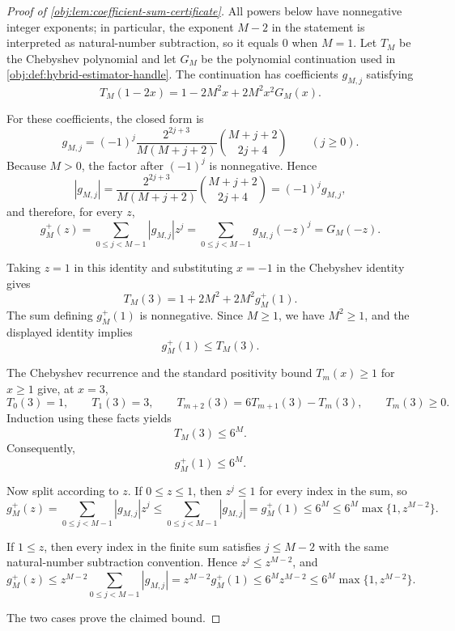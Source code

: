 \begin{proof}[Proof of \cref{obj:lem:coefficient-sum-certificate}]
All powers below have nonnegative integer exponents; in particular, the exponent \(M-2\) in the statement is interpreted as natural-number subtraction, so it equals \(0\) when \(M=1\).  Let \(T_M\) be the Chebyshev polynomial and let \(G_M\) be the polynomial continuation used in \cref{obj:def:hybrid-estimator-handle}.  The continuation has coefficients \(g_{M,j}\) satisfying
\[
T_M(1-2x)
=
1-2M^2x+2M^2x^2G_M(x).
\]

For these coefficients, the closed form is
\[
g_{M,j}
=
(-1)^j
\frac{2^{2j+3}}{M(M+j+2)}
{M+j+2\choose 2j+4}
\qquad (j\ge0).
\]
Because \(M>0\), the factor after \((-1)^j\) is nonnegative.  Hence
\[
|g_{M,j}|
=
\frac{2^{2j+3}}{M(M+j+2)}
{M+j+2\choose 2j+4}
=
(-1)^j g_{M,j},
\]
and therefore, for every \(z\),
\[
g_M^+(z)
=
\sum_{0\le j<M-1}|g_{M,j}|z^j
=
\sum_{0\le j<M-1}g_{M,j}(-z)^j
=
G_M(-z).
\]

Taking \(z=1\) in this identity and substituting \(x=-1\) in the Chebyshev identity gives
\[
T_M(3)
=
1+2M^2+2M^2g_M^+(1).
\]
The sum defining \(g_M^+(1)\) is nonnegative.  Since \(M\ge1\), we have \(M^2\ge1\), and the displayed identity implies
\[
g_M^+(1)\le T_M(3).
\]

The Chebyshev recurrence and the standard positivity bound \(T_m(x)\ge1\) for \(x\ge1\) give, at \(x=3\),
\[
T_0(3)=1,\qquad T_1(3)=3,\qquad
T_{m+2}(3)=6T_{m+1}(3)-T_m(3),\qquad T_m(3)\ge0.
\]
Induction using these facts yields
\[
T_M(3)\le 6^M.
\]
Consequently,
\[
g_M^+(1)\le 6^M.
\]

Now split according to \(z\).  If \(0\le z\le1\), then \(z^j\le1\) for every index in the sum, so
\[
g_M^+(z)
=
\sum_{0\le j<M-1}|g_{M,j}|z^j
\le
\sum_{0\le j<M-1}|g_{M,j}|
=
g_M^+(1)
\le 6^M
\le 6^M\max\{1,z^{M-2}\}.
\]

If \(1\le z\), then every index in the finite sum satisfies \(j\le M-2\) with the same natural-number subtraction convention.  Hence \(z^j\le z^{M-2}\), and
\[
g_M^+(z)
\le
z^{M-2}\sum_{0\le j<M-1}|g_{M,j}|
=
z^{M-2}g_M^+(1)
\le
6^M z^{M-2}
\le
6^M\max\{1,z^{M-2}\}.
\]

The two cases prove the claimed bound.
\end{proof}
